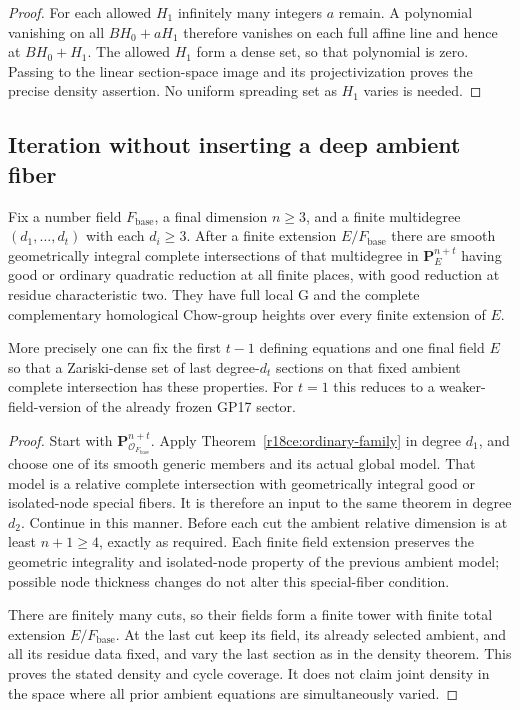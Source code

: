 \begin{proof}
For each allowed $H_1$ infinitely many integers
$a$ remain.  A polynomial vanishing on all
$BH_0+aH_1$ therefore vanishes on each full
affine line and hence at $BH_0+H_1$.
The allowed $H_1$ form a dense set, so that
polynomial is zero.  Passing to the linear
section-space image and its projectivization
proves the precise density assertion.  No
uniform spreading set as $H_1$ varies is
needed.
\end{proof}

\subsection{Iteration without inserting a deep ambient fiber}

\begin{corollary}
\label{r18ce:iteration}
Fix a number field $F_{\mathrm{base}}$, a final dimension
$n\ge3$, and a finite multidegree
$(d_1,\ldots,d_t)$ with each $d_i\ge3$.
After a finite extension $E/F_{\mathrm{base}}$ there
are smooth geometrically integral complete intersections
of that multidegree in $\mathbf P_E^{n+t}$ having
good or ordinary quadratic reduction at all finite
places, with good reduction at residue characteristic
two.  They have full local G and the complete
complementary homological Chow-group heights over
every finite extension of $E$.

More precisely one can fix the first $t-1$ defining
equations and one final field $E$ so that a Zariski-dense
set of last degree-$d_t$ sections on that fixed
ambient complete intersection has these properties.
For $t=1$ this reduces to a weaker-field-version of
the already frozen GP17 sector.
\end{corollary}

\begin{proof}
Start with $\mathbf P^{n+t}_{\mathcal O_{F_{\mathrm{base}}}}$.
Apply Theorem~\ref{r18ce:ordinary-family} in degree
$d_1$, and choose one of its smooth generic members
and its actual global model.  That model is a
relative complete intersection with geometrically
integral good or isolated-node special fibers.
It is therefore an input to the same theorem in
degree $d_2$.  Continue in this manner.
Before each cut the ambient relative dimension
is at least $n+1\ge4$, exactly as required.
Each finite field extension preserves the geometric
integrality and isolated-node property of the
previous ambient model; possible node thickness
changes do not alter this special-fiber condition.

There are finitely many cuts, so their fields
form a finite tower with finite total extension
$E/F_{\mathrm{base}}$.  At the last cut keep
its field, its already selected ambient, and
all its residue data fixed, and vary the
last section as in the density theorem.
This proves the stated density and cycle
coverage.  It does not claim joint density
in the space where all prior ambient equations
are simultaneously varied.
\end{proof}

